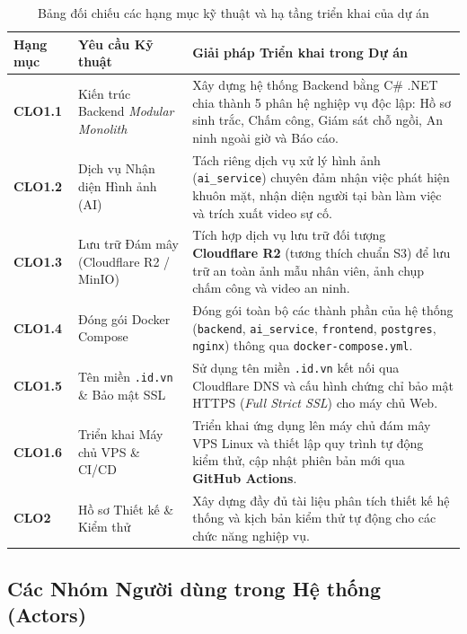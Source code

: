 \documentclass[12pt,a4paper]{article}
\begin{document}
\begin{table}[H]
\centering
\caption{Bảng đối chiếu các hạng mục kỹ thuật và hạ tầng triển khai của dự án}
\begin{tabular}{|C{\tabcolsep\relax}|L{\tabcolsep\relax}|L{\tabcolsep\relax}|}
\hline
{}
\textbf{Hạng mục} & \textbf{Yêu cầu Kỹ thuật} & \textbf{Giải pháp Triển khai trong Dự án} \\
\hline
\textbf{CLO1.1} & Kiến trúc Backend \textit{Modular Monolith} & Xây dựng hệ thống Backend bằng C\# .NET chia thành 5 phân hệ nghiệp vụ độc lập: Hồ sơ sinh trắc, Chấm công, Giám sát chỗ ngồi, An ninh ngoài giờ và Báo cáo. \\
\hline
{}
\textbf{CLO1.2} & Dịch vụ Nhận diện Hình ảnh (AI) & Tách riêng dịch vụ xử lý hình ảnh (\texttt{ai\_service}) chuyên đảm nhận việc phát hiện khuôn mặt, nhận diện người tại bàn làm việc và trích xuất video sự cố. \\
\hline
\textbf{CLO1.3} & Lưu trữ Đám mây (Cloudflare R2 / MinIO) & Tích hợp dịch vụ lưu trữ đối tượng \textbf{Cloudflare R2} (tương thích chuẩn S3) để lưu trữ an toàn ảnh mẫu nhân viên, ảnh chụp chấm công và video an ninh. \\
\hline
{}
\textbf{CLO1.4} & Đóng gói Docker Compose & Đóng gói toàn bộ các thành phần của hệ thống (\texttt{backend}, \texttt{ai\_service}, \texttt{frontend}, \texttt{postgres}, \texttt{nginx}) thông qua \texttt{docker-compose.yml}. \\
\hline
\textbf{CLO1.5} & Tên miền \texttt{.id.vn} \& Bảo mật SSL & Sử dụng tên miền \texttt{.id.vn} kết nối qua Cloudflare DNS và cấu hình chứng chỉ bảo mật HTTPS (\textit{Full Strict SSL}) cho máy chủ Web. \\
\hline
{}
\textbf{CLO1.6} & Triển khai Máy chủ VPS \& CI/CD & Triển khai ứng dụng lên máy chủ đám mây VPS Linux và thiết lập quy trình tự động kiểm thử, cập nhật phiên bản mới qua \textbf{GitHub Actions}. \\
\hline
\textbf{CLO2} & Hồ sơ Thiết kế \& Kiểm thử & Xây dựng đầy đủ tài liệu phân tích thiết kế hệ thống và kịch bản kiểm thử tự động cho các chức năng nghiệp vụ. \\
\hline
\end{tabular}
\end{table}

\subsection{Các Nhóm Người dùng trong Hệ thống (Actors)}
\end{document}
